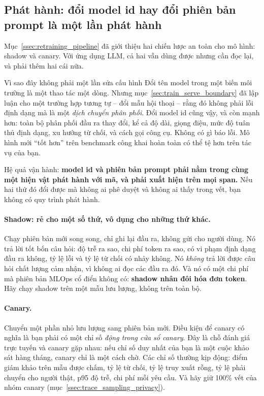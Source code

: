 \subsection{Phát hành: đổi model id hay đổi phiên bản prompt là một lần phát hành}
\label{ssec:llm_release}

Mục~\ref{ssec:retraining_pipeline} đã giới thiệu hai chiến lược an toàn cho mô hình: shadow và canary. Với ứng dụng LLM, cả hai vẫn dùng được nhưng cần đọc lại, và phải thêm hai cái nữa.

\begin{keyidea}{Vì sao đây không phải một lần sửa cấu hình}
Đổi tên model trong một biến môi trường là một thao tác một dòng. Nhưng mục~\ref{sec:train_serve_boundary} đã lập luận cho một trường hợp tương tự -- đổi mẫu hội thoại -- rằng đó không phải lỗi định dạng mà là một \emph{dịch chuyển phân phối}. Đổi model id cũng vậy, và còn mạnh hơn: toàn bộ phân phối đầu ra thay đổi, kể cả độ dài, giọng điệu, mức độ tuân thủ định dạng, xu hướng từ chối, và cách gọi công cụ. Không có gì báo lỗi. Mô hình mới ``tốt hơn'' trên benchmark công khai hoàn toàn có thể tệ hơn trên tác vụ của bạn.

Hệ quả vận hành: \textbf{model id và phiên bản prompt phải nằm trong cùng một hiện vật phát hành với mã, và phải xuất hiện trên mọi span.} Nếu hai thứ đó đổi được mà không ai phê duyệt và không ai thấy trong vết, bạn không có quy trình phát hành.
\end{keyidea}

\paragraph{Shadow: rẻ cho một số thứ, vô dụng cho những thứ khác.} Chạy phiên bản mới song song, chỉ ghi lại đầu ra, không gửi cho người dùng. Nó trả lời tốt bốn câu hỏi: độ trễ ra sao, chi phí token ra sao, có vi phạm định dạng đầu ra không, tỷ lệ lỗi và tỷ lệ từ chối có nhảy không. Nó \emph{không} trả lời được câu hỏi chất lượng cảm nhận, vì không ai đọc các đầu ra đó. Và nó có một chi phí mà phiên bản MLOps cổ điển không có: \textbf{shadow nhân đôi hóa đơn token}. Hãy chạy shadow trên một mẫu lưu lượng, không trên toàn bộ.

\paragraph{Canary.} Chuyển một phần nhỏ lưu lượng sang phiên bản mới. Điều kiện để canary có nghĩa là bạn phải có một chỉ số \emph{động trong cửa sổ canary}. Đây là chỗ đánh giá trực tuyến và canary gặp nhau: nếu chỉ số duy nhất của bạn là một cuộc khảo sát hàng tháng, canary chỉ là một cách chờ. Các chỉ số thường kịp động: điểm giám khảo trên mẫu được chấm, tỷ lệ từ chối, tỷ lệ truy xuất rỗng, tỷ lệ phải chuyển cho người thật, p95 độ trễ, chi phí mỗi yêu cầu. Và hãy giữ 100\% vết của nhóm canary (mục~\ref{ssec:trace_sampling_privacy}).

